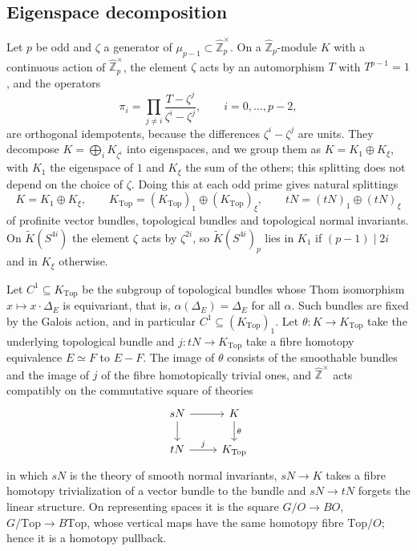 \documentclass[11pt]{amsart}
\theoremstyle{plain}
\theoremstyle{definition}
\numberwithin{equation}{section}
\newcommand{\Zhat}{\widehat{\mathbb{Z}}}
\newcommand{\Ktop}{K_{\mathrm{Top}}}
\newcommand{\units}{^{\times}}
\begin{document}
\subsection{Eigenspace decomposition}
Let $p$ be odd and $\zeta$ a generator of $\mu_{p-1}\subset\Zhat_p\units$.
On a $\Zhat_p$-module $K$ with a continuous action of $\Zhat_p\units$, the element $\zeta$ acts by an automorphism $T$ with $T^{p-1}=1$, and the operators
\[
\pi_i=\prod_{j\ne i}\frac{T-\zeta^j}{\zeta^i-\zeta^j},\qquad i=0,\dots,p-2,
\]
are orthogonal idempotents, because the differences $\zeta^i-\zeta^j$ are units.
They decompose $K=\bigoplus_iK_{\zeta^i}$ into eigenspaces, and we group them as $K=K_1\oplus K_\xi$, with $K_1$ the eigenspace of $1$ and $K_\xi$ the sum of the others; this splitting does not depend on the choice of $\zeta$.
Doing this at each odd prime gives natural splittings
\[
K=K_1\oplus K_\xi,\qquad\Ktop=(\Ktop)_1\oplus(\Ktop)_\xi,\qquad tN=(tN)_1\oplus(tN)_\xi
\]
of profinite vector bundles, topological bundles and topological normal invariants.
On $\widetilde K(S^{4i})$ the element $\zeta$ acts by $\zeta^{2i}$, so $\widetilde K(S^{4i})_p$ lies in $K_1$ if $(p-1)\mid 2i$ and in $K_\xi$ otherwise.

Let $C^1\subseteq\Ktop$ be the subgroup of topological bundles whose Thom isomorphism $x\mapsto x\cdot\Delta_E$ is equivariant, that is, $\alpha(\Delta_E)=\Delta_E$ for all $\alpha$.
Such bundles are fixed by the Galois action, and in particular $C^1\subseteq(\Ktop)_1$.
Let $\theta\colon K\to\Ktop$ take the underlying topological bundle and $j\colon tN\to\Ktop$ take a fibre homotopy equivalence $E\simeq F$ to $E-F$.
The image of $\theta$ consists of the smoothable bundles and the image of $j$ of the fibre homotopically trivial ones, and $\Zhat\units$ acts compatibly on the commutative square of theories
\begin{equation}\label{eq:geomsquare}
\begin{tikzcd}
sN\arrow[r]\arrow[d] & K\arrow[d,"\theta"]\\
tN\arrow[r,"j"] & \Ktop
\end{tikzcd}
\end{equation}
in which $sN$ is the theory of smooth normal invariants, $sN\to K$ takes a fibre homotopy trivialization of a vector bundle to the bundle and $sN\to tN$ forgets the linear structure.
On representing spaces it is the square $G/O\to BO$, $G/\mathrm{Top}\to B\mathrm{Top}$, whose vertical maps have the same homotopy fibre $\mathrm{Top}/O$; hence it is a homotopy pullback.
\end{document}
